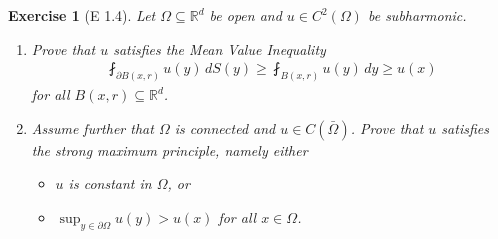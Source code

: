 \documentclass{report}
\theoremstyle{tommy}
\newtheorem{ex}[defn]{Exercise}
\begin{document}
  \begin{ex}[E 1.4]
    Let \(\Omega \subseteq \mathbb{R}^d\) be open and \(u \in C^2(\Omega)\) be subharmonic.
    \begin{enumerate}[label=\alph*)]
      \item Prove that \(u\) satisfies the Mean Value Inequality
      \begin{align*}
        \fint_{\partial B(x, r)} u(y) \, dS(y)
        \ge \fint_{B(x, r)} u(y) \, dy
        \ge u(x)
      \end{align*}
      for all \(B(x,r) \subseteq \mathbb{R}^d\).
      \item Assume further that \(\Omega\) is connected and \(u \in C(\bar \Omega)\). Prove that \(u\) satisfies the strong maximum principle, namely either
      \begin{itemize}
        \item \(u\) is constant in \(\Omega\), or 
        \item \(\sup_{y \in \partial \Omega} u(y) > u(x)\) for all \(x \in \Omega\).
      \end{itemize}
    \end{enumerate}
  \end{ex}
\end{document}
